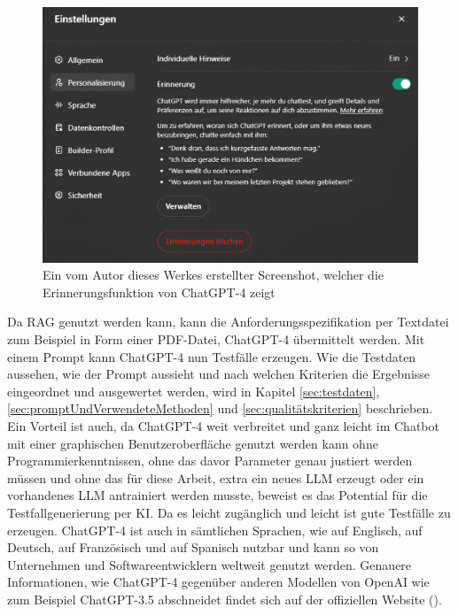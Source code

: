 \documentclass[12pt,toc=bib,toc=listof]{scrreprt}
\begin{document}
\begin{figure}[H]
    \centering
    \includegraphics[width=1\linewidth]{./Bilder/OpenAI_Erinnerungsfunktion ChatGPT-4.png}
    \caption{Ein vom Autor dieses Werkes erstellter Screenshot, welcher die Erinnerungsfunktion von ChatGPT-4 zeigt \textcite{OpenAI2025}}
    \label{fig:enter-label}
\end{figure}
\noindent Da RAG genutzt werden kann, kann die Anforderungsspezifikation per Textdatei zum Beispiel in Form einer PDF-Datei, ChatGPT-4 übermittelt werden. Mit einem Prompt kann ChatGPT-4 nun Testfälle erzeugen. Wie die Testdaten aussehen, wie der Prompt aussieht und nach welchen Kriterien die Ergebnisse eingeordnet und ausgewertet werden, wird in Kapitel \ref{sec:testdaten}, \ref{sec:promptUndVerwendeteMethoden} und \ref{sec:qualitätskriterien} beschrieben. Ein Vorteil ist auch, da ChatGPT-4 weit verbreitet und ganz leicht im Chatbot mit einer graphischen Benutzeroberfläche genutzt werden kann ohne Programmierkenntnissen, ohne das davor Parameter genau justiert werden müssen und ohne das für diese Arbeit, extra ein neues LLM erzeugt oder ein vorhandenes LLM antrainiert werden musste, beweist es das Potential für die Testfallgenerierung per KI. Da es leicht zugänglich und leicht ist gute Testfälle zu erzeugen. ChatGPT-4 ist auch in sämtlichen Sprachen, wie auf Englisch, auf Deutsch, auf Französisch und auf Spanisch nutzbar und kann so von Unternehmen und Softwareentwicklern weltweit genutzt werden. Genauere Informationen, wie ChatGPT-4 gegenüber anderen Modellen von OpenAI wie zum Beispiel ChatGPT-3.5 abschneidet findet sich auf der offiziellen Website (\cite{OpenAI2025}). 
\end{document}
